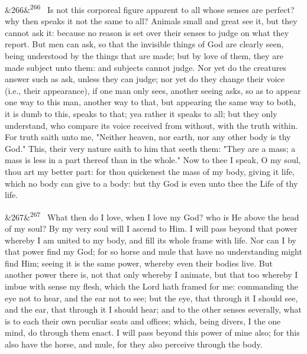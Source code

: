 \documentclass[12pt]{article}
\newcommand{\para}[1][]{\par\noindent\ifx&#1&\else\textsuperscript{\footnotesize #1}~\fi}
\begin{document}
\para[266] Is not this corporeal figure apparent to all whose senses are perfect? why then speaks it not the same to all? Animals small and great see it, but they cannot ask it: because no reason is set over their senses to judge on what they report. But men can ask, so that the invisible things of God are clearly seen, being understood by the things that are made; but by love of them, they are made subject unto them: and subjects cannot judge. Nor yet do the creatures answer such as ask, unless they can judge; nor yet do they change their voice (i.e., their appearance), if one man only sees, another seeing asks, so as to appear one way to this man, another way to that, but appearing the same way to both, it is dumb to this, speaks to that; yea rather it speaks to all; but they only understand, who compare its voice received from without, with the truth within. For truth saith unto me, "Neither heaven, nor earth, nor any other body is thy God." This, their very nature saith to him that seeth them: "They are a mass; a mass is less in a part thereof than in the whole." Now to thee I speak, O my soul, thou art my better part: for thou quickenest the mass of my body, giving it life, which no body can give to a body: but thy God is even unto thee the Life of thy life.

\para[267] What then do I love, when I love my God? who is He above the head of my soul? By my very soul will I ascend to Him. I will pass beyond that power whereby I am united to my body, and fill its whole frame with life. Nor can I by that power find my God; for so horse and mule that have no understanding might find Him; seeing it is the same power, whereby even their bodies live. But another power there is, not that only whereby I animate, but that too whereby I imbue with sense my flesh, which the Lord hath framed for me: commanding the eye not to hear, and the ear not to see; but the eye, that through it I should see, and the ear, that through it I should hear; and to the other senses severally, what is to each their own peculiar seats and offices; which, being divers, I the one mind, do through them enact. I will pass beyond this power of mine also; for this also have the horse, and mule, for they also perceive through the body.
\end{document}
